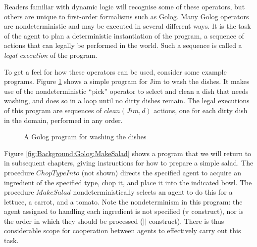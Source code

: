 Readers familiar with dynamic logic will recognise some of these operators,
but others are unique to first-order formalisms such as Golog. Many
Golog operators are nondeterministic and may be executed in several
different ways. It is the task of the agent to plan a deterministic
instantiation of the program, a sequence of actions that can legally
be performed in the world. Such a sequence is called a \emph{legal
execution} of the program.

To get a feel for how these operators can be used, consider some example
programs. Figure \ref{fig:Background:Golog:Washing-Dishes} shows
a simple program for Jim to wash the dishes. It makes use of the nondeterministic
{}``pick'' operator to select and clean a dish that needs washing,
and does so in a loop until no dirty dishes remain. The legal executions
of this program are sequences of $clean(Jim,d)$ actions, one for
each dirty dish in the domain, performed in any order.

%
\begin{figure}
\begin{centering}
\par\end{centering}

\caption{A Golog program for washing the dishes\label{fig:Background:Golog:Washing-Dishes}}

\end{figure}


Figure \ref{fig:Background:Golog:MakeSalad} shows a program that
we will return to in subsequent chapters, giving instructions for
how to prepare a simple salad. The procedure $ChopTypeInto$ (not
shown) directs the specified agent to acquire an ingredient of the
specified type, chop it, and place it into the indicated bowl. The
procedure $MakeSalad$ nondeterministically selects an agent to do
this for a lettuce, a carrot, and a tomato. Note the nondeterminism
in this program: the agent assigned to handling each ingredient is
not specified ($\pi$ construct), nor is the order in which they should
be processed ($||$ construct). There is thus considerable scope for
cooperation between agents to effectively carry out this task.

